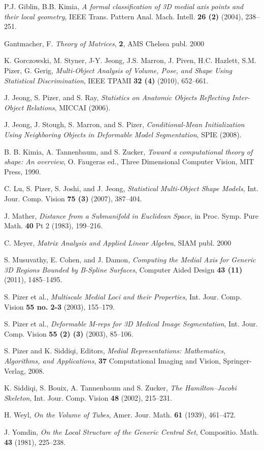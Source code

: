 \documentclass[10pt]{amsart}
\theoremstyle{definition}
\theoremstyle{definition}
\numberwithin{equation}{section}
\begin{document}
\begin{thebibliography}{1}
 P.J. Giblin, B.B. Kimia, {\em A formal classification of 3D 
medial axis points and their local geometry}, IEEE Trans. Pattern Anal. 
Mach. Intell. {\bf 26 (2)} (2004), 238--251.

 Gantmacher, F. {\em Theory of Matrices}, {\bf 2}, AMS 
Chelsea publ. 2000

  K. Gorczowski, M. Styner, J-Y. Jeong, J.S. Marron, J. 
Piven, H.C. Hazlett, S.M. Pizer, G. Gerig, {\em Multi-Object Analysis of 
Volume, Pose, and Shape Using Statistical Discrimination}, IEEE TPAMI 
{\bf 32 (4)} (2010), 652--661.

  J. Jeong, S. Pizer, and S. Ray, {\em Statistics on 
Anatomic Objects Reflecting Inter-Object Relations}, MICCAI (2006).

  J. Jeong, J. Stough, S. Marron, and S. Pizer, {\em 
Conditional-Mean Initialization Using Neighboring Objects in Deformable 
Model Segmentation}, SPIE (2008).

 B. B. Kimia, A. Tannenbaum, and S. Zucker, {\em Toward 
a computational theory of shape: An overview}, O. Faugeras ed., Three 
Dimensional Computer Vision, MIT Press, 1990.

 C. Lu, S. Pizer, S. Joshi, and J. Jeong, {\em Statistical 
Multi-Object Shape Models}, Int. Jour. Comp. Vision  {\bf 75 (3)} (2007), 
387--404.

  J. Mather,  {\em Distance from a Submanifold in 
Euclidean Space}, in Proc. Symp. Pure Math. {\bf 40} Pt 2 (1983),
 199--216.

 C. Meyer, {\em Matrix Analysis and Applied Linear 
Algebra},  SIAM publ. 2000

 S. Musuvathy, E. Cohen, and J. Damon, {\em Computing 
the Medial Axis for Generic 3D Regions Bounded by B-Spline Surfaces}, 
Computer Aided Design {\bf 43 (11)} (2011), 1485--1495.

 S. Pizer et al., {\em Multiscale Medial Loci and their 
Properties}, Int. Jour. Comp. Vision {\bf 55 no. 2-3} (2003), 155--179.

 S. Pizer et al., {\em Deformable M-reps for 3D Medical 
Image Segmentation}, Int. Jour. Comp. Vision {\bf 55 (2) (3)} (2003), 
85--106.

 S. Pizer and K. Siddiqi, Editors, {\em Medial 
Representations: Mathematics, Algorithms, and Applications}, {\bf 
37} Computational Imaging and Vision, Springer-Verlag, 2008.

 K. Siddiqi, S. Bouix, A. Tannenbaum and S. Zucker, 
{\em  The Hamilton--Jacobi Skeleton}, Int. Jour. Comp. Vision {\bf 48} 
(2002), 215--231.

  H. Weyl, {\em On the Volume of Tubes}, Amer. Jour. 
Math. {\bf 61} (1939),  461--472.

  J. Yomdin, {\em On the Local Structure of the Generic 
Central Set}, Compositio. Math. {\bf 43} (1981), 225--238.

\end{thebibliography}
\end{document}
